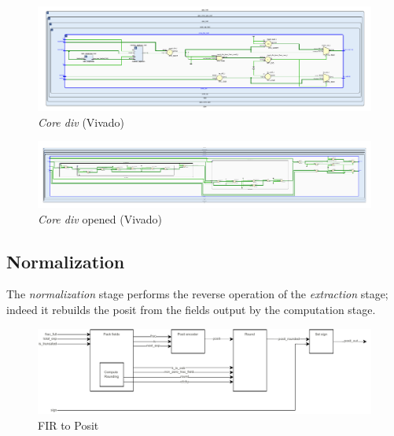     \begin{figure}
        \includegraphics[width=1\textwidth]{figures/div_vivado.pdf}
        \caption{\textit{Core div} (Vivado)}
        \label{fig:div1vivado}
    \end{figure}
    \begin{figure}
        \includegraphics[width=1\textwidth]{figures/div_opened_vivado.pdf}
        \caption{\textit{Core div} opened (Vivado)}
        \label{fig:div2vivado}
    \end{figure}








\subsection{Normalization}

The \textit{normalization} stage performs the reverse operation of the \textit{extraction} stage; indeed it rebuilds the posit from the fields output by the computation stage.



\begin{figure}[h!]
    \begin{center}
    \includegraphics[width=1\textwidth]{figures/fir-to-posit-drawing.drawio.pdf}
    \caption{FIR to Posit}
    \label{fig:fir2posit_ppu}
    \end{center}
\end{figure}

